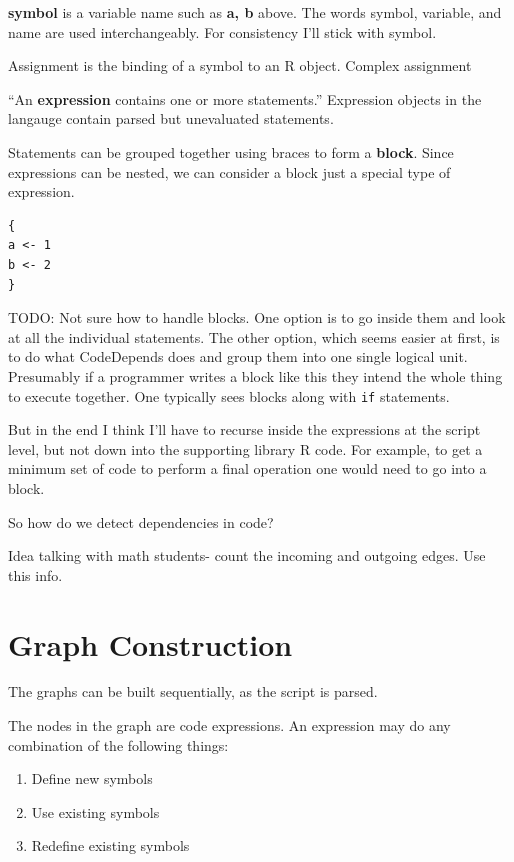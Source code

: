 \documentclass[12pt]{article}
\begin{document}
\textbf{symbol} is a variable name such as \textbf{a, b} above.  The words
symbol, variable, and name are used interchangeably. For consistency I'll
stick with symbol.

Assignment is the binding of a symbol to an R object. Complex assignment

``An \textbf{expression} contains one or more statements.'' Expression objects
in the langauge contain parsed but unevaluated statements. 

Statements can be grouped together using braces to form a \textbf{block}.
Since expressions can be nested, we can consider a block just a special
type of expression.

\begin{verbatim}
{
a <- 1
b <- 2
}
\end{verbatim}

TODO: Not sure how to handle blocks. One option is to go inside them and
look at all the individual statements. The other option, which seems easier
at first, is to do what CodeDepends does and group them into one
single logical unit. Presumably if a programmer writes a block like this
they intend the whole thing to execute together. One typically sees blocks
along with \texttt{if} statements.

But in the end I think I'll have to recurse inside the expressions at the
script level, but not down into the supporting library R code. For example, to
get a minimum set of code to perform a final operation one would need to go
into a block.

So how do we detect dependencies in code?

Idea talking with math students- count the incoming and outgoing edges. Use
this info.

\section{Graph Construction}

The graphs can be built sequentially, as the script is parsed.

The nodes in the graph are code expressions.
An expression may do any combination of the following things:
\begin{enumerate}
    \item Define new symbols
    \item Use existing symbols
    \item Redefine existing symbols
\end{enumerate}
\end{document}
